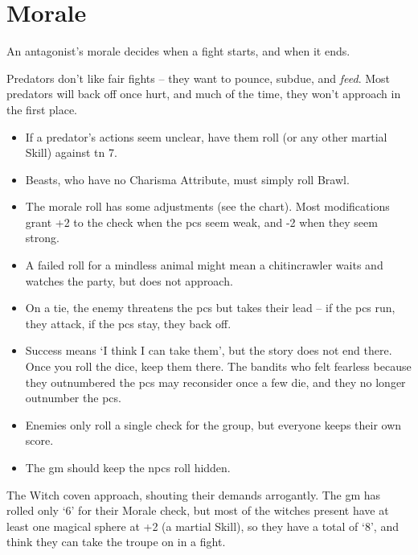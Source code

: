 \section{Morale}
\label{morale}
\begin{multicols}{2}

\noindent
An antagonist's morale decides when a fight starts, and when it ends.

Predators don't like fair fights -- they want to pounce, subdue, and \emph{feed}.
Most predators will back off once hurt, and much of the time, they won't approach in the first place.


\begin{itemize}
  \item
  If a predator's actions seem unclear, have them roll  (or any other martial Skill) against \gls{tn} 7.
  \item
  Beasts, who have no Charisma Attribute, must simply roll Brawl.
  \item
  The morale roll has some adjustments (see the chart).
  Most modifications grant +2 to the check when the \glspl{pc} seem weak, and -2 when they seem strong.
  \item
  A failed roll for a mindless animal might mean a chitincrawler waits and watches the party, but does not approach.

  \item
  On a tie, the enemy threatens the \glspl{pc} but takes their lead -- if the \glspl{pc} run, they attack, if the \glspl{pc} stay, they back off.
  \item
  Success means `I think I can take them', but the story does not end there.
  Once you roll the dice, keep them there.
  The bandits who felt fearless because they outnumbered the \glspl{pc} may reconsider once a few die, and they no longer outnumber the \glspl{pc}.
  \item
  Enemies only roll a single check for the group, but everyone keeps their own score.
  \item
  The \gls{gm} should keep the \glspl{npc} roll hidden.
\end{itemize}

\begin{exampletext}
  The Witch coven approach, shouting their demands arrogantly.
  The \gls{gm} has rolled only `6' for their Morale check, but most of the witches present have at least one magical sphere at +2 (a martial Skill), so they have a total of `8', and think they can take the troupe on in a fight.


\end{exampletext}
\end{multicols}
